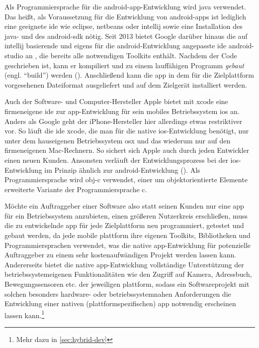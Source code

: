 Als Programmiersprache für die \gls{android}-\gls{app}-Entwicklung wird \gls{java} verwendet. Das heißt, als Voraussetzung für die Entwicklung von \gls{android}-\glspl{app} ist lediglich eine geeignete \gls{ide} wie \gls{eclipse}, \gls{netbeans} oder \gls{intellij} sowie eine Installation des \gls{java}- und des \gls{android}-\gls{sdk} nötig. 
Seit 2013 bietet Google darüber hinaus die auf \gls{intellij} basierende und eigens für die \gls{android}-Entwicklung angepasste \gls{ide} \gls{android-studio} an \cite{android-studio}, die bereits alle notwendigen Toolkits enthält. 
Nachdem der Code geschrieben ist, kann er kompiliert und zu einem lauffähigen Programm \emph{gebaut} (engl. \enquote{build}) %
 werden (). Anschließend kann die \gls{app} in dem für die Zielplattform vorgesehenen Dateiformat ausgeliefert und auf dem Zielgerät installiert werden.

Auch der Software- und Computer-Hersteller Apple bietet mit \gls{xcode} eine firmeneigene \gls{ide} zur \gls{app}-Entwicklung für sein mobiles Betriebssystem \gls{ios} an. Anders als Google geht der iPhone-Hersteller hier allerdings etwas restriktiver vor. So läuft die \gls{ide} \gls{xcode}, die man für die native \gls{ios}-Entwicklung benötigt, nur unter dem hauseigenen Betriebssystem \gls{osx} und das wiederum nur auf den firmeneigenen Mac-Rechnern. So sichert sich Apple auch durch jeden Entwickler einen neuen Kunden. 
Ansonsten verläuft der Entwicklungsprozess bei der \gls{ios}-Entwicklung im Prinzip ähnlich zur \gls{android}-Entwicklung ().
Als Programmiersprache wird \gls{obj-c} verwendet, einer um objektorientierte Elemente erweiterte Variante der Programmiersprache \gls{c}.

Möchte ein Auftraggeber einer Software also statt seinen Kunden nur eine \gls{app} für ein Betriebssystem anzubieten, einen größeren Nutzerkreis erschließen, muss die zu entwickelnde \gls{app} für jede Zielplattform neu programmiert, getestet und gebaut werden, da jede mobile \gls{plattform} ihre eigenen Toolkits, Bibliotheken und Programmiersprachen verwendet, was die native \gls{app}-Entwicklung für potenzielle Auftraggeber zu einem sehr kostenaufwändigen Projekt werden lassen kann.
Andererseits bietet die native \gls{app}-Entwicklung vollständige Unterstützung der betriebssystemeigenen Funktionalitäten wie den Zugriff auf Kamera, Adressbuch, Bewegungssensoren etc. der jeweiligen \gls{plattform}, sodass ein Softwareprojekt mit solchen besonders hardware- oder betriebssystemnahen Anforderungen die Entwicklung einer nativen (plattformspezifischen) \gls{app} notwendig erscheinen lassen kann.\footnote{Mehr dazu in \autoref{sec:hybrid-dev}}

